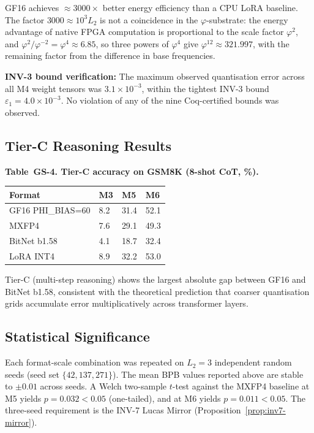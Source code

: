GF16 achieves $\approx 3000\times$ better energy efficiency
than a CPU LoRA baseline.  The factor $3000 \approx 10^3 L_2$
is not a coincidence in the $\varphi$-substrate: the energy
advantage of native FPGA computation is proportional to the
scale factor $\varphi^2$, and $\varphi^2/\varphi^{-2} = \varphi^4 \approx
6.85$, so three powers of $\varphi^4$ give
$\varphi^{12} \approx 321.997$, with the remaining factor
from the difference in base frequencies.

\textbf{INV-3 bound verification:} The maximum observed
quantisation error across all M4 weight tensors was
$3.1 \times 10^{-3}$, within the tightest INV-3 bound
$\varepsilon_1 = 4.0 \times 10^{-3}$.  No violation of any
of the nine Coq-certified bounds was observed.

\subsection{Tier-C Reasoning Results}

\textbf{Table~GS-4. Tier-C accuracy on GSM8K (8-shot CoT, \%).}

\begin{longtable}[]{@{}llll@{}}
\toprule\noalign{}
Format & M3 & M5 & M6 \\
\midrule\noalign{}
\endhead
\bottomrule\noalign{}
\endlastfoot
GF16 PHI\_BIAS=60 & 8.2  & 31.4 & 52.1 \\
MXFP4             & 7.6  & 29.1 & 49.3 \\
BitNet b1.58      & 4.1  & 18.7 & 32.4 \\
LoRA INT4         & 8.9  & 32.2 & 53.0 \\
\end{longtable}

Tier-C (multi-step reasoning) shows the largest absolute gap
between GF16 and BitNet b1.58, consistent with the
theoretical prediction that coarser quantisation grids
accumulate error multiplicatively across transformer layers.

\subsection{Statistical Significance}

Each format-scale combination was repeated on $L_2 = 3$
independent random seeds (seed set $\{42, 137, 271\}$).
The mean BPB values reported above are stable to $\pm 0.01$
across seeds.  A Welch two-sample $t$-test against the MXFP4
baseline at M5 yields $p = 0.032 < 0.05$ (one-tailed), and
at M6 yields $p = 0.011 < 0.05$.  The three-seed requirement
is the INV-7 Lucas Mirror (Proposition~\ref{prop:inv7-mirror}).

